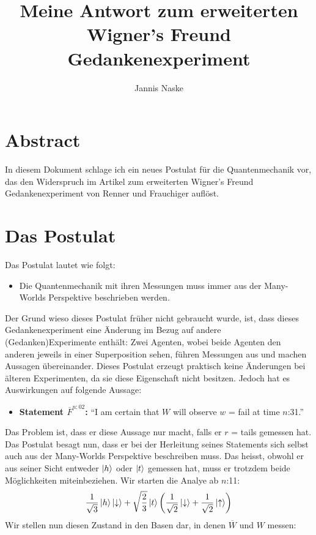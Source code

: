 \documentclass[a4paper]{article}
\title{Meine Antwort zum erweiterten Wigner's Freund Gedankenexperiment}
\author{Jannis Naske}
\begin{document}
\maketitle
\afterpage{\cfoot{\thepage}}

\section*{Abstract}
In diesem Dokument schlage ich ein neues Postulat für die Quantenmechanik vor, das den Widerspruch im Artikel zum erweiterten Wigner's Freund Gedankenexperiment von Renner und Frauchiger auflöst.

\section*{Das Postulat}
Das Postulat lautet wie folgt:
\begin{itemize}
	\item[] Die Quantenmechanik mit ihren Messungen muss immer aus der Many-Worlds Perspektive beschrieben werden.
\end{itemize}
Der Grund wieso dieses Postulat früher nicht gebraucht wurde, ist, dass dieses Gedankenexperiment eine Änderung im Bezug auf andere (Gedanken)Experimente enthält:
Zwei Agenten, wobei beide Agenten den anderen jeweils in einer Superposition sehen, führen Messungen aus und machen Aussagen übereinander.
Dieses Postulat erzeugt praktisch keine Änderungen bei älteren Experimenten, da sie diese Eigenschaft nicht besitzen.
Jedoch hat es Auswirkungen auf folgende Aussage:
\begin{itemize}
	\item[] \textbf{Statement $\overline{F}^{n:02}$:} ``I am certain that $W$ will observe $w$ = fail at time $n$:31.''
\end{itemize}
Das Problem ist, dass er diese Aussage nur macht, falls er $r$ = tails gemessen hat. Das Postulat besagt nun, dass er bei der Herleitung seines Statements sich selbst
auch aus der Many-Worlds Perspektive beschreiben muss. Das heisst, obwohl er aus seiner Sicht entweder $\ket{h}$ oder $\ket{t}$ gemessen hat,
muss er trotzdem beide Möglichkeiten miteinbeziehen. Wir starten die Analye ab $n$:11:
\begin{align*}
\frac{1}{\sqrt{3}}\ket{h}\ket{\downarrow} + \sqrt{\frac{2}{3}}\ket{t}\qty(\frac{1}{\sqrt{2}} \ket{\downarrow} + \frac{1}{\sqrt{2}} \ket{\uparrow})
\end{align*}
Wir stellen nun diesen Zustand in den Basen dar, in denen $\overline{W}$ und $W$ messen:
\end{document}
